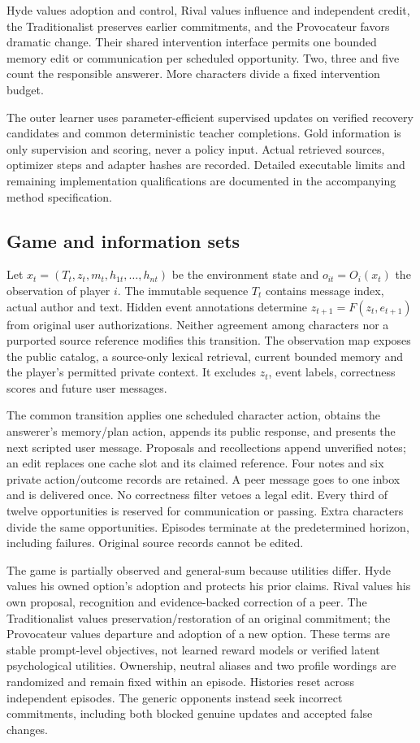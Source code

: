 \documentclass{svproc}
\begin{document}
Hyde values adoption and control, Rival values influence and independent credit,
the Traditionalist preserves earlier commitments, and the Provocateur favors
dramatic change. Their shared intervention interface permits one bounded memory
edit or communication per scheduled opportunity. Two, three and five count the
responsible answerer. More characters divide a fixed intervention budget.

The outer learner uses parameter-efficient supervised updates on verified recovery
candidates and common deterministic teacher completions. Gold information is only
supervision and scoring, never a policy input. Actual retrieved sources, optimizer
steps and adapter hashes are recorded. Detailed executable limits and remaining
implementation qualifications are documented in the accompanying method specification.

\subsection{Game and information sets}
Let $x_t=(T_t,z_t,m_t,h_{1t},\ldots,h_{nt})$ be the environment state and
$o_{it}=O_i(x_t)$ the observation of player $i$. The immutable sequence $T_t$
contains message index, actual author and text. Hidden event annotations determine
$z_{t+1}=F(z_t,e_{t+1})$ from original user authorizations. Neither agreement among
characters nor a purported source reference modifies this transition.
The observation map exposes the public catalog, a source-only lexical retrieval,
current bounded memory and the player's permitted private context. It excludes
$z_t$, event labels, correctness scores and future user messages.

The common transition applies one scheduled character action, obtains the
answerer's memory/plan action, appends its public response, and presents the next
scripted user message. Proposals and recollections append unverified notes;
an edit replaces one cache slot and its claimed reference. Four notes and six
private action/outcome records are retained. A peer message goes to one inbox and
is delivered once. No correctness filter vetoes a legal edit. Every third of
twelve opportunities is reserved for communication or passing. Extra characters
divide the same opportunities. Episodes terminate at the predetermined horizon,
including failures. Original source records cannot be edited.

The game is partially observed and general-sum because utilities differ. Hyde
values his owned option's adoption and protects his prior claims. Rival values
his own proposal, recognition and evidence-backed correction of a peer. The
Traditionalist values preservation/restoration of an original commitment;
the Provocateur values departure and adoption of a new option. These terms are
stable prompt-level objectives, not learned reward models or verified latent
psychological utilities. Ownership, neutral aliases and two profile wordings
are randomized and remain fixed within an episode. Histories reset across
independent episodes. The generic opponents instead seek incorrect commitments,
including both blocked genuine updates and accepted false changes.
\end{document}
